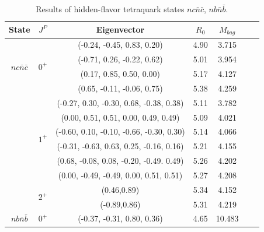 \documentclass[prd,twocolumn,floatfix,nofootinbib]{revtex4}
\begin{document}
\renewcommand{\tabcolsep}{0.84cm}
\renewcommand{\arraystretch}{1.2}
\begin{table}[!htbp]
    \caption{Results of hidden-flavor tetraquark states $nc\bar{n}\bar{c}$, $nb\bar{n}\bar{b}$.}
    \label{tab:hiddenflavor-nQnQ}
    \begin{tabular}{ccccccc}
        \hline\hline
        {\rm State}     &$J^{P}$    &{\rm Eigenvector}                          &$R_{0}$    &$M_{bag}$ \\ \hline
        \multirow{4}{*}{$nc\bar{n}\bar{c}$}
                        &\multirow{4}{*}{$0^{+}$}         
                                    &(-0.24, -0.45, 0.83, 0.20)                 &4.90	    &3.715 \\ 
                        &           &(-0.71, 0.26, -0.22, 0.62)                 &5.01	    &3.954 \\ 
                        &           &(0.17, 0.85, 0.50, 0.00)                   &5.17	    &4.127 \\ 
                        &           &(0.65, -0.11, -0.06, 0.75)                 &5.38	    &4.259 \\ 
                        &\multirow{6}{*}{$1^{+}$}
                                    &(-0.27, 0.30, -0.30, 0.68, -0.38, 0.38)    &5.11	    &3.782 \\ 
                        &           &(0.00, 0.51, 0.51, 0.00, 0.49, 0.49)       &5.09	    &4.021 \\ 
                        &           &(-0.60, 0.10, -0.10, -0.66, -0.30, 0.30)   &5.14	    &4.066 \\ 
                        &           &(-0.31, -0.63, 0.63, 0.25, -0.16, 0.16)    &5.21	    &4.155 \\ 
                        &           &(0.68, -0.08, 0.08, -0.20, -0.49. 0.49)    &5.26	    &4.202 \\ 
                        &           &(0.00, -0.49, -0.49, 0.00, 0.51, 0.51)     &5.27	    &4.208 \\ 
                        &\multirow{2}{*}{$2^{+}$}    
                                    &(0.46,0.89)                                &5.34	    &4.152 \\ 
                        &           &(-0.89,0.86)                               &5.31	    &4.219 \\ 
        \multirow{4}{*}{$nb\bar{n}\bar{b}$}
                        &\multirow{4}{*}{$0^{+}$}
                                    &(-0.37, -0.31, 0.80, 0.36)                 &4.65	    &10.483 \\ 

\end{tabular}
\end{table}
\end{document}
